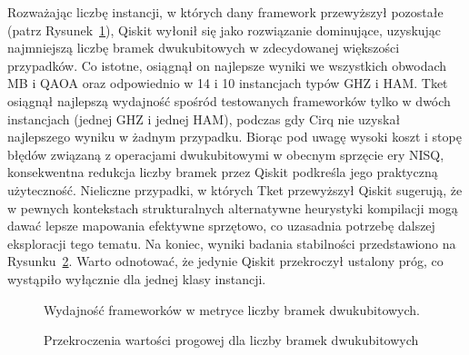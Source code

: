 Rozważając liczbę instancji, w których dany framework przewyższył pozostałe (patrz Rysunek~\ref{fig:heatmap_twoqubit}), Qiskit wyłonił się jako rozwiązanie dominujące, uzyskując najmniejszą liczbę bramek dwukubitowych w zdecydowanej większości przypadków. Co istotne, osiągnął on najlepsze wyniki we wszystkich obwodach MB i QAOA oraz odpowiednio w 14 i 10 instancjach typów GHZ i HAM. Tket osiągnął najlepszą wydajność spośród testowanych frameworków tylko w dwóch instancjach (jednej GHZ i jednej HAM), podczas gdy Cirq nie uzyskał najlepszego wyniku w żadnym przypadku.
Biorąc pod uwagę wysoki koszt i stopę błędów związaną z operacjami dwukubitowymi w obecnym sprzęcie ery NISQ, konsekwentna redukcja liczby bramek przez Qiskit podkreśla jego praktyczną użyteczność.
Nieliczne przypadki, w których Tket przewyższył Qiskit sugerują, że w pewnych kontekstach strukturalnych alternatywne heurystyki kompilacji mogą dawać lepsze mapowania efektywne sprzętowo, co uzasadnia potrzebę dalszej eksploracji tego tematu.
Na koniec, wyniki badania stabilności przedstawiono na Rysunku~\ref{fig:threshold-exceedances}. Warto odnotować, że jedynie Qiskit przekroczył ustalony próg, co wystąpiło wyłącznie dla jednej klasy instancji.

\begin{figure}[!ht]
  \centering
  
 \caption{Wydajność frameworków w metryce liczby bramek dwukubitowych.}
  \label{fig:heatmap_twoqubit}
\end{figure}

\begin{figure}[!ht]
\centering

\caption{Przekroczenia wartości progowej dla liczby bramek dwukubitowych}
\label{fig:threshold-exceedances}
\end{figure}

